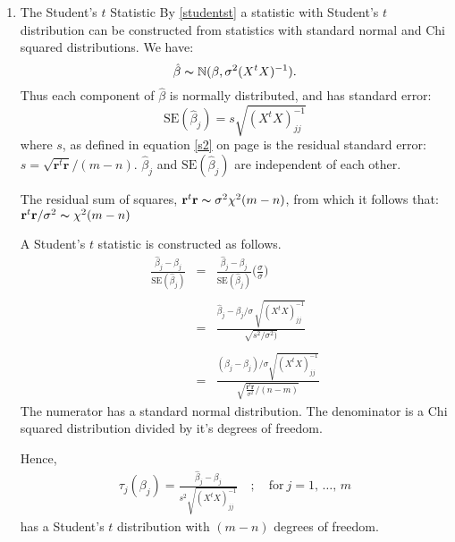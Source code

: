 \begin{enumerate}
\item The Student's $t$ Statistic
\newline \newline
By \ref{studentst} a statistic with Student's $t$ distribution can be constructed from statistics with standard normal and Chi squared distributions. We have:
 \[\hat{\beta} \thicksim \mathbb{N}(\beta, \sigma^2 (X^t X)^{-1} ).\] Thus each component of $\hat{\beta}$ is normally distributed, and has standard error: 
 \[ \mbox{SE}(\hat{\beta}_j) = s \sqrt{ (X^t X)_{jj}^{-1}}\]
where $s$, as defined in equation \ref{s2} on page \pageref{s2} is the residual standard error: $ s = \sqrt{\mathbf{r}^t\mathbf{r} }/ (m-n)$. $\hat{\beta}_j$ and $\mbox{SE}(\hat{\beta}_j)$ are independent of each other.

The residual sum of squares, $ \mathbf{r}^t \mathbf{r}\thicksim \sigma^2 \chi^2(m - n)$, from which it follows that: $ \mathbf{r}^t \mathbf{r}/\sigma^2  \thicksim \chi^2(m - n)$

A Student's $t$ statistic is constructed as follows.
\begin{eqnarray}
\frac{\hat{\beta}_j -\beta_j}{\mbox{SE}(\hat{\beta}_j)} &= & \frac{\hat{\beta}_j -\beta_j}{\mbox{SE}(\hat{\beta}_j)}\bigg(\frac{\sigma}{\sigma} \bigg) \nonumber \\ \nonumber \\
&=& \frac{\hat{\beta}_j -\beta_j / \sigma\, \sqrt{ \left(X^t X \right)_{jj}^{-1}}}{\sqrt{s^2/\sigma^2) }}
\\ \nonumber \\
&=& \frac{ (\hat{\beta}_j -\beta_j) / \sigma \sqrt{ \left( X^t X \right)_{jj}^{-1}}}
{
\sqrt {  \frac{ \mathbf{r} ^t \mathbf{r} }
{ \sigma^2  } / \scriptstyle{(n-m)} }
}
\end{eqnarray}
The numerator has a standard normal distribution. The denominator is a Chi squared distribution divided by it's degrees of freedom.

Hence, \begin{eqnarray} \label{t-stat}
\tau_j(\beta_j) = \frac{\hat{\beta}_j -\beta_j}{s^2\sqrt{ (X^t X)_{jj}^{-1}}} \quad ; \quad \mbox{for}\  j = 1, \, \ldots, \, m
\end{eqnarray}
has a Student's $t$ distribution with $(m-n)$ degrees of freedom.

\end{enumerate}





